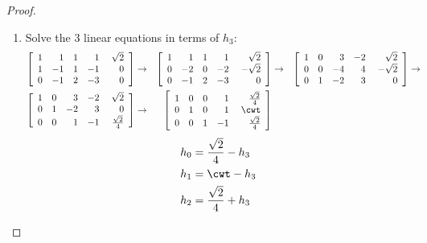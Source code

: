\begin{proof}
\begin{enumerate}
\begin{enumerate}
\item Solve the 3 linear equations in terms of $h_3$:
\begin{align*}
\left[\begin{array}{rrrr@{\hspace{3ex}}r}
    1 &  1 &  1 &  1 & \sqrt{2}   \\
    1 & -1 &  1 & -1 & 0          \\
    0 & -1 &  2 & -3 & 0
\end{array}\right]
&\rightarrow&
\left[\begin{array}{rrrr@{\hspace{3ex}}r}
    1 &  1 &  1 &  1 & \sqrt{2}   \\
    0 & -2 &  0 & -2 &-\sqrt{2}   \\
    0 & -1 &  2 & -3 & 0          
\end{array}\right]
&\rightarrow&
\left[\begin{array}{rrrr@{\hspace{3ex}}r}
    1 &  0 &  3 & -2 & \sqrt{2}   \\
    0 &  0 & -4 &  4 &-\sqrt{2}   \\
    0 &  1 & -2 &  3 & 0          
\end{array}\right]
&\rightarrow&
\\ 
\left[\begin{array}{rrrr@{\hspace{3ex}}r}
    1 &  0 &  3 & -2 & \sqrt{2}   \\
    0 &  1 & -2 &  3 & 0          \\
    0 &  0 &  1 & -1 & \frac{\sqrt{2}}{4}
\end{array}\right]
&\rightarrow&
\left[\begin{array}{rrrr@{\hspace{3ex}}r}
    1 &  0 &  0 &  1 & \frac{\sqrt{2}}{4}   \\
    0 &  1 &  0 &  1 & \cwt    \\
    0 &  0 &  1 & -1 & \frac{\sqrt{2}}{4}
\end{array}\right]
\end{align*}
\begin{align*}
  h_0 &= \frac{\sqrt{2}}{4} - h_3  \\
  h_1 &= \cwt  - h_3  \\
  h_2 &= \frac{\sqrt{2}}{4} + h_3  \\
\end{align*}


\end{enumerate}
\end{enumerate}
\end{proof}

